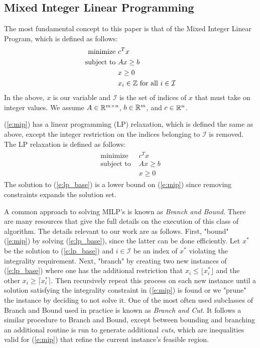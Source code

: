 \documentclass[10pt]{article}
\begin{document}
	\subsection{Mixed Integer Linear Programming} \label{ss:milp}
	The most fundamental concept to this paper is that of the Mixed Integer Linear Program, which is defined as follows:
	\begin{align}
		\begin{split}
			\text{minimize } & c^T x \\
			\text{subject to } & Ax \geq b \\
			& x \geq 0 \\
			& x_i \in \mathbb{Z} \text{ for all } i \in \mathcal{I}
		\end{split} \label{e:mip}
	\end{align}
	In the above, $ x $ is our variable and $ \mathcal{I} $ is the set of indices of $ x $ that must take on integer values. We assume $ A \in \mathbb{R}^{m \times n} $, $ b \in \mathbb{R}^m $, and $ c \in \mathbb{R}^n $.
	
	(\ref{e:mip}) has a linear programming (LP) relaxation, which is defined the same as above, except the integer restriction on the indices belonging to $ \mathcal{I} $ is removed. The LP relaxation is defined as follows:
	\begin{align}
		\begin{split}
			\text{minimize } & c^T x \\
			\text{subject to } & Ax \geq b \\
			& x \geq 0
		\end{split} \label{e:lp_base}
	\end{align}
	The solution to (\ref{e:lp_base}) is a lower bound on (\ref{e:mip}) since removing constraints expands the solution set.
	
	A common approach to solving MILP's is known as \textit{Branch and Bound}. There are many resources that give the full details on the execution of this class of algorithm. The details relevant to our work are as follows. First, "bound" (\ref{e:mip}) by solving (\ref{e:lp_base}), since the latter can be done efficiently. Let $ x^* $ be the solution to (\ref{e:lp_base}) and $ i \in \mathcal{I} $ be an index of $ x^* $ violating the integrality requirement. Next, "branch" by creating two new instances of (\ref{e:lp_base}) where one has the additional restriction that $ x_i \leq \lfloor x_i^* \rfloor $ and the other $ x_i \geq \lceil x_i^* \rceil $. Then recursively repeat this process on each new instance until a solution satisfying the integrality constraint in (\ref{e:mip}) is found or we "prune" the instance by deciding to not solve it. One of the most often used subclasses of Branch and Bound used in practice is known as \textit{Branch and Cut}. It follows a similar procedure to Branch and Bound, except between bounding and branching an additional routine is run to generate additional \textit{cuts}, which are inequalities valid for (\ref{e:mip}) that refine the current instance's feasible region.
	
\end{document}
